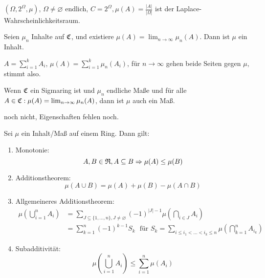 		\begin{bsp}
			$(\Omega, 2^\Omega, \mu)$, $\Omega\neq\varnothing$ endlich, $C=2^\Omega, \mu(A)=\frac{|A|}{|\Omega|}$ ist der Laplace-Wahrscheinlich\-keitsraum.
		\end{bsp}
		\begin{satz}
			Seien $\mu_n$ Inhalte auf $\mathfrak{C}$, und existiere $\mu(A)=\lim_{n\to\infty} \mu_n(A)$. Dann ist $\mu$ ein Inhalt. 
		\end{satz}
		\begin{bew}
			$A=\sum_{i=1}^k A_i$, $\mu(A)=\sum_{i=1}^k \mu_n(A_i)$, für $n\to\infty$ gehen beide Seiten gegen $\mu$, stimmt also. 
		\end{bew}
		\begin{satz}
			Wenn $\mathfrak{C}$ ein Sigmaring ist und $\mu_n$ endliche Maße und für alle $A\in\mathfrak{C}: \mu(A)=\lim_{n\to\infty} \mu_n(A)$, dann ist $\mu$ auch ein Maß. 
		\end{satz}
		\begin{bew}
			noch nicht, Eigenschaften fehlen noch. 
		\end{bew}
		\begin{satz}
			Sei $\mu$ ein Inhalt/Maß auf einem Ring. Dann gilt:
			\begin{enumerate}
				\item Monotonie: 
				\[ A,B\in\mathfrak{R}, A\subseteq B\Rightarrow \mu(A)\le \mu(B) \]
				\item Additionstheorem:
				\[ \mu(A\cup B)=\mu(A)+\mu(B)-\mu(A\cap B) \]
				\item Allgemeineres Additionstheorem:
				\begin{align*}
				\mu\left(\bigcup_{i=1}^n A_i\right)&=\sum_{J\subseteq\{1,...,n\}, J\neq \varnothing} (-1)^{|J|-1}\mu\left(\bigcap_{i\in J} A_i\right)\\
				&=\sum_{k=1}^n (-1)^{k-1} S_k \:\:\:\text{für } S_k=\sum_{i\le i_1<...<i_k\le n} \mu\left(\bigcap_{k=1}^n A_{i_k}\right)
				\end{align*}
				\item Subadditivität:
				\[ \mu\left(\bigcup_{i=1}^n A_i\right)\le \sum_{i=1}^n \mu(A_i) \]
			\end{enumerate}
			
		\end{satz}
